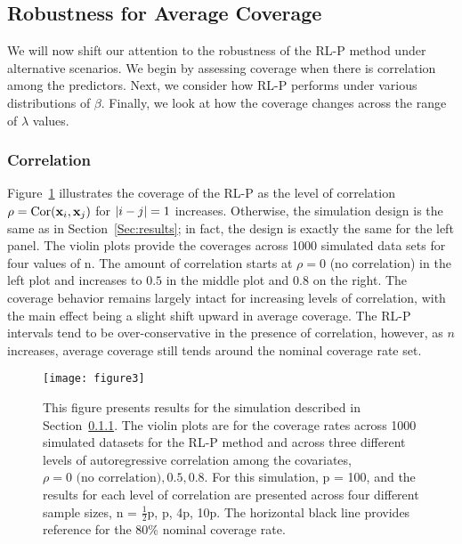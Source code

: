 \subsection{Robustness for Average Coverage}
\label{Sec:robustness}

We will now shift our attention to the robustness of the RL-P method under alternative scenarios. We begin by assessing coverage when there is correlation among the predictors. Next, we consider how RL-P performs under various distributions of $\beta$. Finally, we look at how the coverage changes across the range of $\lambda$ values.

\subsubsection{Correlation}
\label{Sec:correlation}

Figure~\ref{Fig:correlation_structure} illustrates the coverage of the RL-P as the level of correlation $\rho = \textrm{Cor}(\mathbf{x}_i, \mathbf{x}_j)$ for $\left\lvert i-j\right\rvert = 1$ increases. Otherwise, the simulation design is the same as in Section~\ref{Sec:results}; in fact, the design is exactly the same for the left panel. The violin plots provide the coverages across 1000 simulated data sets for four values of n. The amount of correlation starts at $\rho = 0$ (no correlation) in the left plot and increases to $0.5$ in the middle plot and $0.8$ on the right. The coverage behavior remains largely intact for increasing levels of correlation, with the main effect being a slight shift upward in average coverage. The RL-P intervals tend to be over-conservative in the presence of correlation, however, as $n$ increases, average coverage still tends around the nominal coverage rate set.

\begin{figure}[htb!]
  \begin{center}
    \texttt{[image: figure3]}
    \caption{\label{Fig:correlation_structure} This figure presents results for the simulation described in Section~\ref{Sec:correlation}. The violin plots are for the coverage rates across 1000 simulated datasets for the RL-P method and across three different levels of autoregressive correlation among the covariates, $\rho = 0 \text{ (no correlation)}, 0.5, 0.8$. For this simulation, p = 100, and the results for each level of correlation are presented across four different sample sizes, n = $\frac{1}{2}$p, p, 4p, 10p. The horizontal black line provides reference for the 80\% nominal coverage rate.}
  \end{center}
\end{figure}

